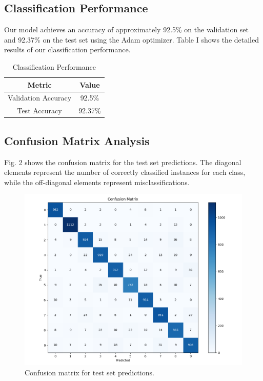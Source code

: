 \documentclass[10pt,journal,compsoc]{IEEEtran}
\begin{document}
\subsection{Classification Performance}
Our model achieves an accuracy of approximately 92.5\% on the validation set and 92.37\% on the test set using the Adam optimizer. Table I shows the detailed results of our classification performance.

\begin{table}[htbp]
\caption{Classification Performance}
\begin{center}
\begin{tabular}{|c|c|}
\hline
\textbf{Metric} & \textbf{Value} \\
\hline
Validation Accuracy & 92.5\% \\
\hline
Test Accuracy & 92.37\% \\
\hline
\end{tabular}
\end{center}
\label{tab:performance}
\end{table}

\subsection{Confusion Matrix Analysis}
Fig. 2 shows the confusion matrix for the test set predictions. The diagonal elements represent the number of correctly classified instances for each class, while the off-diagonal elements represent misclassifications.

\begin{figure}[htbp]
\centering
\includegraphics[width=0.8\linewidth]{img/confusionmatrix.png}
\caption{Confusion matrix for test set predictions.}
\label{fig:confusion_matrix}
\end{figure}
\end{document}
